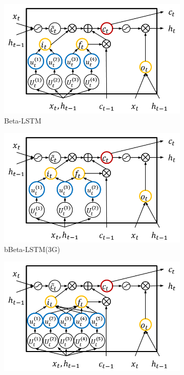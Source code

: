\documentclass[letterpaper]{article} %
\begin{document}
\begin{figure}[t!] %
	\centering
	\begin{subfigure}{.48\columnwidth}
		\centering
		\includegraphics[width=\linewidth]{BLSTM_cell.png}
		\caption{Beta-LSTM} 
	\end{subfigure}\hfil
	\begin{subfigure}{.48\columnwidth}
		\centering
		\includegraphics[width=\linewidth]{bBLSTM_3G_cell.png}
		\caption{bBeta-LSTM(3G)} 
	\end{subfigure}
	\begin{subfigure}{.48\columnwidth}
		\centering
		\includegraphics[width=\linewidth]{bBLSTM_5G_cell.png}

\end{subfigure}
\end{figure}
\end{document}
